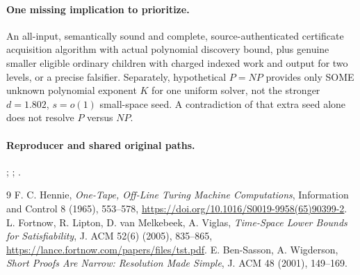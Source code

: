 \documentclass[11pt]{article}
\begin{document}
\paragraph{One missing implication to prioritize.}
An all-input, semantically sound and complete, source-authenticated certificate acquisition algorithm with actual polynomial discovery bound, plus genuine smaller eligible ordinary children with charged indexed work and output for two levels, or a precise falsifier. Separately, hypothetical $P=NP$ provides only SOME unknown polynomial exponent $K$ for one uniform solver, not the stronger $d=1.802$, $s=o(1)$ small-space seed. A contradiction of that extra seed alone does not resolve $P$ versus $NP$.

\paragraph{Reproducer and shared original paths.}
;
;
.
\begin{thebibliography}{9}
 F. C. Hennie, \emph{One-Tape, Off-Line Turing Machine Computations}, Information and Control 8 (1965), 553--578, \url{https://doi.org/10.1016/S0019-9958(65)90399-2}.
 L. Fortnow, R. Lipton, D. van Melkebeek, A. Viglas, \emph{Time-Space Lower Bounds for Satisfiability}, J. ACM 52(6) (2005), 835--865, \url{https://lance.fortnow.com/papers/files/tst.pdf}.
 E. Ben-Sasson, A. Wigderson, \emph{Short Proofs Are Narrow: Resolution Made Simple}, J. ACM 48 (2001), 149--169.
\end{thebibliography}
\end{document}
